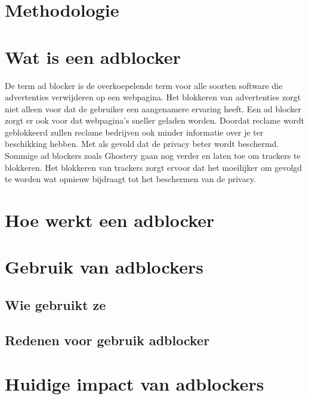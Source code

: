 \documentclass[pdftex,a4paper,12pt,twoside]{report}
\begin{document}
\chapter{Methodologie}
\label{ch:methodologie}



\chapter{Wat is een adblocker}
\label{ch:Wat is een adblocker}
De term ad blocker is de overkoepelende term voor alle soorten software die advertenties verwijderen op een webpagina. Het blokkeren van advertenties zorgt niet alleen voor dat de gebruiker een aangenamere ervaring heeft. Een ad blocker zorgt er ook voor dat webpagina's sneller geladen worden. Doordat reclame wordt geblokkeerd zullen reclame bedrijven ook minder informatie over je ter beschikking hebben. Met als gevold dat de privacy beter wordt beschermd. Sommige ad blockers zoals Ghostery gaan nog verder en laten toe om trackers te blokkeren. Het blokkeren van trackers zorgt ervoor dat het moeilijker om gevolgd te worden wat opnieuw bijdraagt tot het beschermen van de privacy.

\chapter{Hoe werkt een adblocker}
\label{ch:Hoe werkt een adblocker}
\chapter{Gebruik van adblockers}
\label{ch:Gebruik van adblockers}
\section{Wie gebruikt ze}
\label{sec:Wie gebruikt ze}
\section{Redenen voor gebruik adblocker}
\label{sec:Redenen voor gebruik adblocker}
\chapter{Huidige impact van adblockers}
\label{ch:Huidige impact van adblockers}
\end{document}
